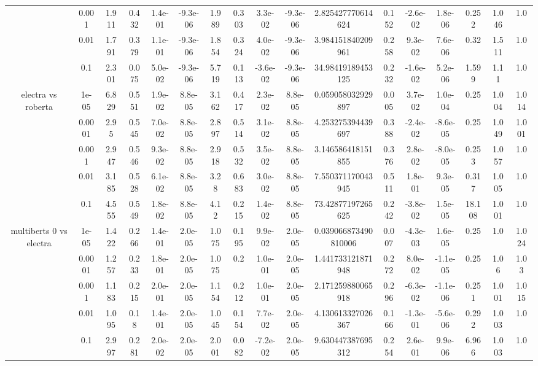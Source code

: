 \begin{tabular}{|c|c|c|c|c|c|c|c|c|c|c|c|c|c|c|c|c|}
 & 0.001 & 1.911 & 0.432 & 1.4e-01 & -9.3e-06 & 1.989 & 0.303 & 3.3e-02 & -9.3e-06 & 2.825427770614624 & 0.152 & -2.6e-02 & 1.8e-06 & 0.252 & 1.046 & 1.0 \\
 & 0.01 & 1.791 & 0.379 & 1.1e-01 & -9.3e-06 & 1.854 & 0.324 & 4.0e-02 & -9.3e-06 & 3.984151840209961 & 0.258 & 9.3e-02 & 7.6e-06 & 0.32 & 1.511 & 1.0 \\
 & 0.1 & 2.301 & 0.075 & 5.0e-02 & -9.3e-06 & 5.719 & 0.113 & -3.6e-02 & -9.3e-06 & 34.98419189453125 & 0.232 & -1.6e-02 & 5.2e-06 & 1.599 & 1.11 & 1.0 \\
\hline
\multirow{5}{*}{electra  vs roberta } & 1e-05 & 6.829 & 0.551 & 1.9e-02 & 8.8e-05 & 3.162 & 0.417 & 2.3e-02 & 8.8e-05 & 0.059058032929897 & 0.005 & 3.7e-02 & 1.0e-04 & 0.25 & 1.004 & 1.014 \\
 & 0.0001 & 2.95 & 0.545 & 7.0e-02 & 8.8e-05 & 2.897 & 0.514 & 3.1e-02 & 8.8e-05 & 4.253275394439697 & 0.388 & -2.4e-02 & -8.6e-05 & 0.25 & 1.049 & 1.001 \\
 & 0.001 & 2.947 & 0.546 & 9.3e-02 & 8.8e-05 & 2.918 & 0.532 & 3.5e-02 & 8.8e-05 & 3.146586418151855 & 0.376 & 2.8e-02 & -8.0e-05 & 0.253 & 1.057 & 1.0 \\
 & 0.01 & 3.185 & 0.528 & 6.1e-02 & 8.8e-05 & 3.28 & 0.683 & 3.0e-02 & 8.8e-05 & 7.550371170043945 & 0.511 & 1.8e-01 & 9.3e-05 & 0.317 & 1.005 & 1.0 \\
 & 0.1 & 4.555 & 0.549 & 1.8e-02 & 8.8e-05 & 4.12 & 0.215 & 1.4e-02 & 8.8e-05 & 73.42877197265625 & 0.242 & -3.8e-02 & 1.5e-05 & 18.108 & 1.001 & 1.0 \\
\hline
\multirow{5}{*}{multiberts 0 vs electra } & 1e-05 & 1.422 & 0.266 & 1.4e-01 & 2.0e-05 & 1.075 & 0.195 & 9.9e-02 & 2.0e-05 & 0.039066873490810006 & 0.007 & -4.3e-03 & 1.6e-05 & 0.25 & 1.0 & 1.024 \\
 & 0.0001 & 1.257 & 0.233 & 1.8e-01 & 2.0e-05 & 1.075 & 0.2 & 1.0e-01 & 2.0e-05 & 1.441733121871948 & 0.272 & 8.0e-02 & -1.1e-05 & 0.25 & 1.06 & 1.03 \\
 & 0.001 & 1.183 & 0.215 & 2.0e-01 & 2.0e-05 & 1.154 & 0.212 & 1.0e-01 & 2.0e-05 & 2.171259880065918 & 0.296 & -6.3e-02 & -1.1e-06 & 0.251 & 1.001 & 1.015 \\
 & 0.01 & 1.095 & 0.18 & 1.4e-01 & 2.0e-05 & 1.045 & 0.154 & 7.7e-02 & 2.0e-05 & 4.130613327026367 & 0.166 & -1.3e-01 & -5.6e-06 & 0.292 & 1.003 & 1.0 \\
 & 0.1 & 2.997 & 0.281 & 2.0e-02 & 2.0e-05 & 2.001 & 0.082 & -7.2e-02 & 2.0e-05 & 9.630447387695312 & 0.254 & 2.6e-01 & 9.9e-06 & 6.966 & 1.003 & 1.0 \\

\end{tabular}
